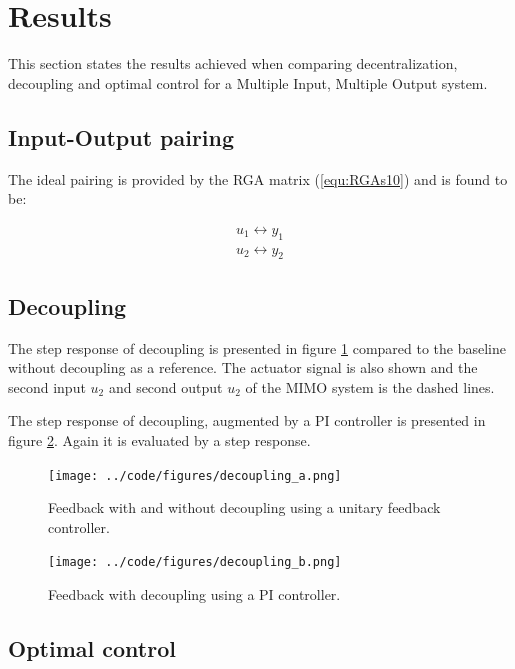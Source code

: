 \documentclass[a4paper, titlepage]{article}
\begin{document}
\section{Results}
This section states the results achieved when comparing decentralization, decoupling and optimal control for a Multiple Input, Multiple Output system.

\subsection{Input-Output pairing}
The ideal pairing is provided by the RGA matrix (\ref{equ:RGAs10}) and is found to be:

\begin{equation}
\begin{split}
u_1 \leftrightarrow y_1 \\
u_2 \leftrightarrow y_2
\end{split}
\label{equ:RGApairing}
\end{equation}

\subsection{Decoupling}

The step response of decoupling is presented in figure \ref{fig:decouplingA} compared to the baseline without decoupling as a reference.
The actuator signal is also shown and the second input $u_2$ and second output $u_2$ of the MIMO system is the dashed lines.

The step response of decoupling, augmented by a PI controller is presented in figure \ref{fig:decouplingB}.
Again it is evaluated by a step response.

\begin{figure}[H]
\center
\texttt{[image: ../code/figures/decoupling\_a.png]}
\caption{Feedback with and without decoupling using a unitary feedback controller.}
\label{fig:decouplingA}
\end{figure}

\begin{figure}[H]
\center
\texttt{[image: ../code/figures/decoupling\_b.png]}
\caption{Feedback with decoupling using a PI controller.}
\label{fig:decouplingB}
\end{figure}



\subsection{Optimal control}
\end{document}
